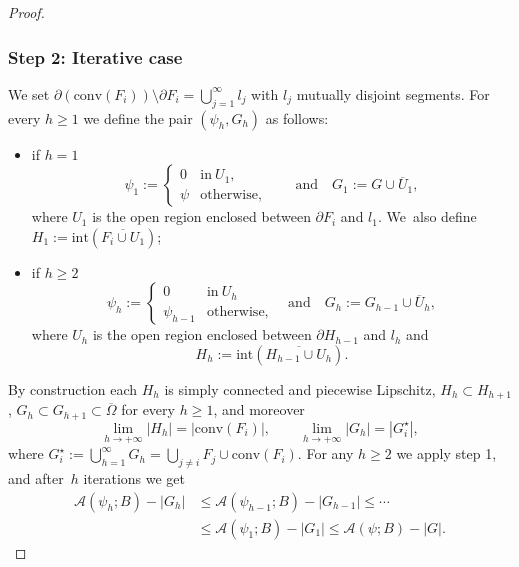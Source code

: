 \documentclass[11pt]{article}
\numberwithin{equation}{section}
\let\Om\Omega
\theoremstyle{definition}
\begin{document}
\begin{proof}
\subsubsection*{Step 2: Iterative case}
We set $\partial(\mathrm{conv}(F_i))
\setminus\partial F_i=\bigcup_{j=1}^\infty l_j$ with $l_j$ mutually disjoint segments.
For every $h\ge1$ we define the pair $(\psi_{h},G_{h})$ as follows:
\begin{itemize}
\item if $h=1$
\begin{equation*}
\psi_{1}:=\begin{cases}
0&\text{in}\ U_1,\\
\psi&\text{otherwise,}
\end{cases}\qquad \text{and}\quad
G_{1}:=G\cup \overline U_1,
\end{equation*}
where $U_1$ is the open region enclosed between $\partial F_i$ and $l_1$. We~also define $H_1:=\mathrm{int}(\overline{F_i\cup U_1})$;
\item if $h\ge2$
\begin{equation*}
\psi_{h}:=\begin{cases}
0&\text{in}\ U_h\\
\psi_{h-1}&\text{otherwise,}
\end{cases}\quad\text{and}\quad
G_{h}:=G_{h-1}\cup\overline U_h ,
\end{equation*}
where $U_h$ is the open region enclosed between $\partial H_{h-1}$ and $l_h$ and
\[
H_h:=\mathrm{int}(\overline{H_{h-1}\cup U_h}).
\]
\end{itemize}
By construction each $H_{h}$ is
simply connected and piecewise Lipschitz, $H_{h}\subset H_{h+1}$, $G_{h}\subset G_{h+1}\subset\overline\Om$ for every $h\ge1$, and moreover
\begin{equation}\label{limit_E*}
\lim_{h\to+\infty} |H_{h}|=|\mathrm{conv}(F_i)|,\qquad
\lim_{h\to+\infty} |G_{h}|=|G^\star_i|,
\end{equation}
where $G^\star_i:=\bigcup_{h=1}^\infty G_h=\bigcup_{j\neq i}F_j\cup \mathrm{conv}(F_i) $. For any $h\geq2$ we apply step 1,
and after~$h$ iterations we get
\begin{equation}\label{iterative_proc*}
\begin{aligned}
\mathcal{A}(\psi_{h};B)-|G_{h}|&\le \mathcal{A}(\psi_{h-1};B)-|G_{h-1}|\le\cdots\\
&\le \mathcal{A}(\psi_{1};B)-|G_{1}|\le \mathcal{A}(\psi;B)-|G|.
\end{aligned}
\end{equation}

\end{proof}
\end{document}
